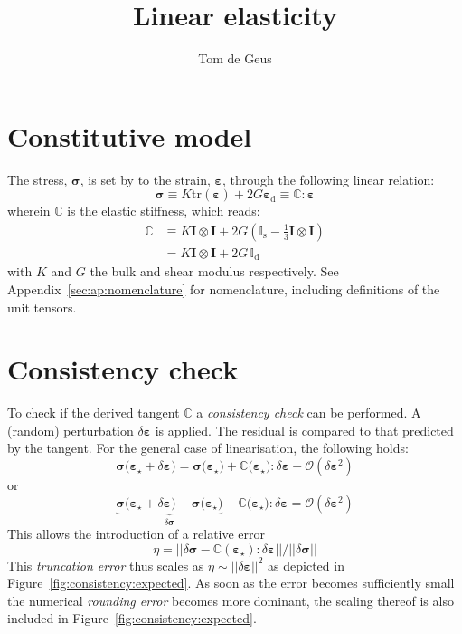 \documentclass{goose-article}
\title{Linear elasticity}
\author[1]{Tom de Geus}
\begin{document}
\maketitle

\section{Constitutive model}

The stress, $\bm{\sigma}$, is set by to the strain, $\bm{\varepsilon}$, through the following linear relation:
\begin{equation}
  \bm{\sigma} \equiv K \mathrm{tr}\left( \bm{\varepsilon} \right) + 2 G \bm{\varepsilon}_\mathrm{d} \equiv \mathbb{C} : \bm{\varepsilon}
\end{equation}
wherein $\mathbb{C}$ is the elastic stiffness, which reads:
\begin{align}
  \mathbb{C}
  &\equiv K \bm{I} \otimes \bm{I}
   + 2 G (\mathbb{I}_\mathrm{s} - \tfrac{1}{3} \bm{I} \otimes \bm{I} )
  \\
  &= K \bm{I} \otimes \bm{I}
  + 2 G \, \mathbb{I}_\mathrm{d}
\end{align}
with $K$ and $G$ the bulk and shear modulus respectively. See Appendix~\ref{sec:ap:nomenclature} for nomenclature, including definitions of the unit tensors.

\section{Consistency check}

To check if the derived tangent $\mathbb{C}$ a \emph{consistency check} can be performed. A (random) perturbation $\delta \bm{\varepsilon}$ is applied. The residual is compared to that predicted by the tangent. For the general case of linearisation, the following holds:
%
\begin{equation}
  \bm{\sigma}\big( \bm{\varepsilon}_\star + \delta \bm{\varepsilon} \big) =
  \bm{\sigma}\big( \bm{\varepsilon}_\star \big) +
  \mathbb{C} \big( \bm{\varepsilon}_\star \big) : \delta \bm{\varepsilon} +
  \mathcal{O}(\delta \bm{\varepsilon}^2)
\end{equation}
%
or
%
\begin{equation}
  \underbrace{
    \bm{\sigma}\big( \bm{\varepsilon}_\star + \delta \bm{\varepsilon} \big) -
    \bm{\sigma}\big( \bm{\varepsilon}_\star \big)
  }_{
    \displaystyle \delta \bm{\sigma}
  } -
  \mathbb{C} \big( \bm{\varepsilon}_\star \big) : \delta \bm{\varepsilon} =
  \mathcal{O}(\delta \bm{\varepsilon}^2)
\end{equation}
%
This allows the introduction of a relative error
%
\begin{equation}
  \eta =
  \Big|\Big|
    \delta \bm{\sigma} -
    \mathbb{C}(\bm{\varepsilon}_\star) : \delta \bm{\varepsilon}
  \Big|\Big|
  /
  \Big|\Big| \delta \bm{\sigma} \Big|\Big|
\end{equation}
%
This \emph{truncation error} thus scales as $\eta \sim || \delta \bm{\varepsilon} ||^2$ as depicted in Figure~\ref{fig:consistency:expected}. As soon as the error becomes sufficiently small the numerical \emph{rounding error} becomes more dominant, the scaling thereof is also included in Figure~\ref{fig:consistency:expected}.
\end{document}
